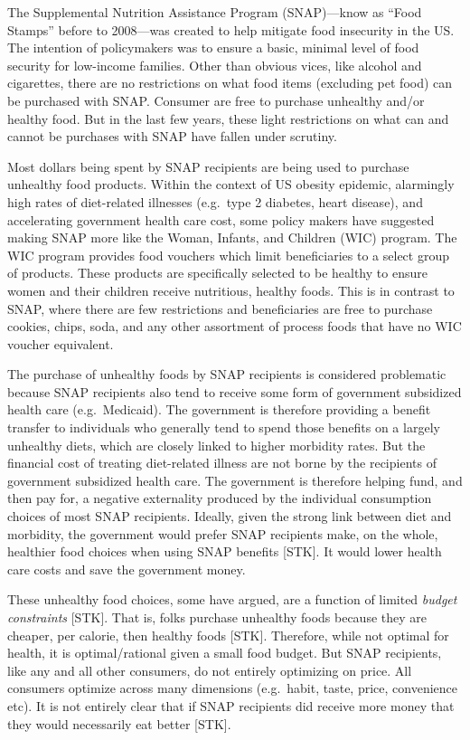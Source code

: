 \documentclass[11pt,letterpaper,]{book}
\begin{document}
The Supplemental Nutrition Assistance Program (SNAP)---know as ``Food
Stamps'' before to 2008---was created to help mitigate food insecurity
in the US. The intention of policymakers was to ensure a basic, minimal
level of food security for low-income families. Other than obvious
vices, like alcohol and cigarettes, there are no restrictions on what
food items (excluding pet food) can be purchased with SNAP. Consumer are
free to purchase unhealthy and/or healthy food. But in the last few
years, these light restrictions on what can and cannot be purchases with
SNAP have fallen under scrutiny.

Most dollars being spent by SNAP recipients are being used to purchase
unhealthy food products. Within the context of US obesity epidemic,
alarmingly high rates of diet-related illnesses (e.g.~type 2 diabetes,
heart disease), and accelerating government health care cost, some
policy makers have suggested making SNAP more like the Woman, Infants,
and Children (WIC) program. The WIC program provides food vouchers which
limit beneficiaries to a select group of products. These products are
specifically selected to be healthy to ensure women and their children
receive nutritious, healthy foods. This is in contrast to SNAP, where
there are few restrictions and beneficiaries are free to purchase
cookies, chips, soda, and any other assortment of process foods that
have no WIC voucher equivalent.

The purchase of unhealthy foods by SNAP recipients is considered
problematic because SNAP recipients also tend to receive some form of
government subsidized health care (e.g.~Medicaid). The government is
therefore providing a benefit transfer to individuals who generally tend
to spend those benefits on a largely unhealthy diets, which are closely
linked to higher morbidity rates. But the financial cost of treating
diet-related illness are not borne by the recipients of government
subsidized health care. The government is therefore helping fund, and
then pay for, a negative externality produced by the individual
consumption choices of most SNAP recipients. Ideally, given the strong
link between diet and morbidity, the government would prefer SNAP
recipients make, on the whole, healthier food choices when using SNAP
benefits {[}STK{]}. It would lower health care costs and save the
government money.

These unhealthy food choices, some have argued, are a function of
limited \emph{budget constraints} {[}STK{]}. That is, folks purchase
unhealthy foods because they are cheaper, per calorie, then healthy
foods {[}STK{]}. Therefore, while not optimal for health, it is
optimal/rational given a small food budget. But SNAP recipients, like
any and all other consumers, do not entirely optimizing on price. All
consumers optimize across many dimensions (e.g.~habit, taste, price,
convenience etc). It is not entirely clear that if SNAP recipients did
receive more money that they would necessarily eat better {[}STK{]}.
\end{document}
